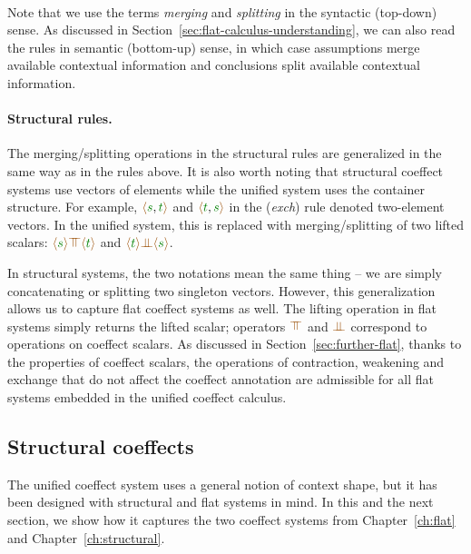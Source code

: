 ~

Note that we use the terms \emph{merging} and \emph{splitting} in the syntactic (top-down) sense. As
discussed in Section~\ref{sec:flat-calculus-understanding}, we can also read
the rules in semantic (bottom-up) sense, in which case assumptions merge available contextual
information and conclusions split available contextual information.

\paragraph{Structural rules.}
The merging/splitting operations in the structural rules are generalized in the same way as in the
rules above. It is also worth noting that structural coeffect systems use vectors of elements while
the unified system uses the container structure.
For example, $\alift{\cclrd{s},\cclrd{t}}$ and $\alift{\cclrd{t},\cclrd{s}}$ in the (\emph{exch})
rule denoted two-element vectors. In the unified system, this is replaced with merging/splitting
of two lifted scalars: $\alift{\cclrd{s}} \azip \alift{\cclrd{t}}$ and $\alift{\cclrd{t}} \apar \alift{\cclrd{s}}$.

In structural systems, the two notations mean the same thing -- we are simply concatenating or splitting two
singleton vectors. However, this generalization allows us to capture flat coeffect systems as well.
The lifting operation in flat systems simply returns the lifted scalar; operators $\azip$ and
$\apar$ correspond to operations on coeffect scalars. As discussed in Section~\ref{sec:further-flat},
thanks to the properties of coeffect scalars, the operations of contraction, weakening and exchange
that do not affect the coeffect annotation are admissible for all flat systems embedded in the
unified coeffect calculus.


\subsection{Structural coeffects}
\label{sec:further-structural}

The unified coeffect system uses a general notion of context shape, but it has been designed with
structural and flat systems in mind. In this and the next section, we show how it captures
the two coeffect systems from Chapter~\ref{ch:flat} and Chapter~\ref{ch:structural}.

